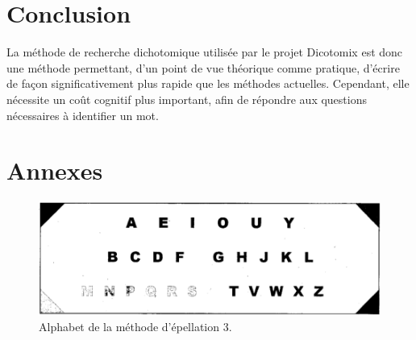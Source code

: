 \documentclass[twoside,twocolumn]{article}
\begin{document}

\section{Conclusion}

La méthode de recherche dichotomique utilisée par le projet Dicotomix est donc une méthode permettant, d'un point de vue théorique comme pratique, d'écrire de façon significativement plus rapide que les méthodes actuelles. Cependant, elle nécessite un coût cognitif plus important, afin de répondre aux questions nécessaires à identifier un mot. 



 
%


\newpage
\section*{Annexes}
\begin{center}
\begin{figure}[h!]
  \includegraphics[scale=0.2]{methode3.png}
  \caption{Alphabet de la méthode d'épellation 3.}
  \label{maxi}
\end{figure}
\end{center}
\end{document}

